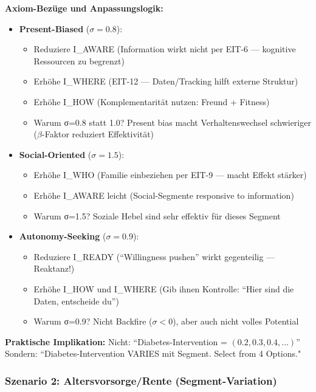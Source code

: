 \textbf{Axiom-Bezüge und Anpassungslogik:}
\begin{itemize}[nosep]
\item \textbf{Present-Biased} ($\sigma = 0.8$):
  \begin{itemize}
  \item Reduziere I_AWARE (Information wirkt nicht per EIT-6 --- kognitive Ressourcen zu begrenzt)
  \item Erhöhe I_WHERE (EIT-12 --- Daten/Tracking hilft externe Struktur)
  \item Erhöhe I_HOW (Komplementarität nutzen: Freund + Fitness)
  \item Warum σ=0.8 statt 1.0? Present bias macht Verhaltenswechsel schwieriger ($\beta$-Faktor reduziert Effektivität)
  \end{itemize}

\item \textbf{Social-Oriented} ($\sigma = 1.5$):
  \begin{itemize}
  \item Erhöhe I_WHO (Familie einbeziehen per EIT-9 --- macht Effekt stärker)
  \item Erhöhe I_AWARE leicht (Social-Segmente responsive to information)
  \item Warum σ=1.5? Soziale Hebel sind sehr effektiv für dieses Segment
  \end{itemize}

\item \textbf{Autonomy-Seeking} ($\sigma = 0.9$):
  \begin{itemize}
  \item Reduziere I_READY (``Willingness pushen'' wirkt gegenteilig --- Reaktanz!)
  \item Erhöhe I_HOW und I_WHERE (Gib ihnen Kontrolle: ``Hier sind die Daten, entscheide du'')
  \item Warum σ=0.9? Nicht Backfire ($\sigma < 0$), aber auch nicht volles Potential
  \end{itemize}
\end{itemize}

\textbf{Praktische Implikation:}
Nicht: ``Diabetes-Intervention = $(0.2, 0.3, 0.4, ...)$''
Sondern: ``Diabetes-Intervention VARIES mit Segment. Select from 4 Options."

\subsubsection{Szenario 2: Altersvorsorge/Rente (Segment-Variation)}

